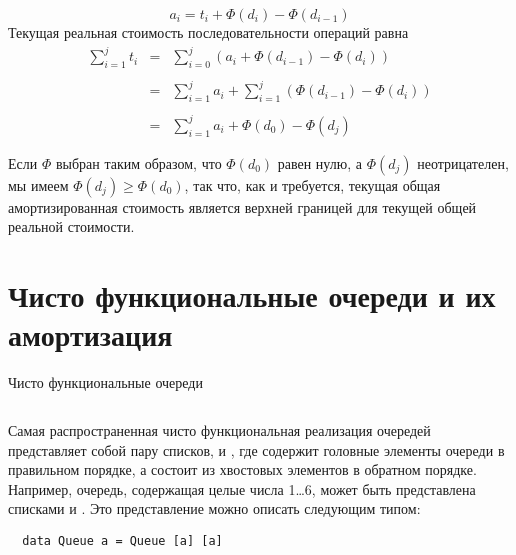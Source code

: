 \begin{frame}[fragile]{}
$$
a_i = t_i + \Phi(d_i) - \Phi(d_{i-1})
$$
Текущая реальная стоимость последовательности операций равна
$$
\begin{array}{rcl}
\sum_{i=1}^j t_i & = & \sum_{i=0}^j (a_i + \Phi(d_{i-1}) - \Phi(d_i))\\
\\
& = & \sum_{i=1}^j a_i + \sum_{i=1}^j (\Phi(d_{i-1}) - \Phi(d_i)) \\
\\
& = & \sum_{i=1}^j a_i + \Phi(d_0) - \Phi(d_j)
\end{array}
$$

Если $\Phi$ выбран таким образом, что
$\Phi(d_0)$ равен нулю, а $\Phi(d_j)$ неотрицателен, мы имеем
$\Phi(d_j) \ge \Phi(d_0)$, так что, как и требуется, текущая общая
амортизированная стоимость является верхней границей для текущей общей
реальной стоимости.

\end{frame}

\begin{comment}
\begin{remark}
Такое описание метода физика несколько упрощает
картину. Часто при анализе оказывается трудно втиснуть реальное
положение дел в указанные рамки. Например, что делать с функциями,
которые порождают или возвращают более одного объекта? Однако даже
упрощенное описание достаточно для демонстрации основных идей.
\end{remark}

\end{comment}

\section{Чисто функциональные очереди и их амортизация}
\label{sc:5.2}


\begin{frame}[fragile]{Чисто функциональные очереди}

\begin{minipage}{.4\textwidth}
  \inputminted[firstline=5,lastline=11] {haskell}{code/Queue.lhs}
\end{minipage}
\begin{minipage}{.55\textwidth}
  Самая распространенная чисто функциональная реализация очередей
  представляет собой пару списков,  и , где
   содержит головные элементы очереди в правильном порядке,
  а  состоит из хвостовых элементов в обратном порядке.\\
  
  Например, очередь, содержащая целые числа 1\ldots 6, может быть
  представлена списками  и
  . Это представление можно описать следующим
  типом:
  \begin{verbatim}
  data Queue a = Queue [a] [a]
  \end{verbatim}
  
\end{minipage}
\end{frame}


